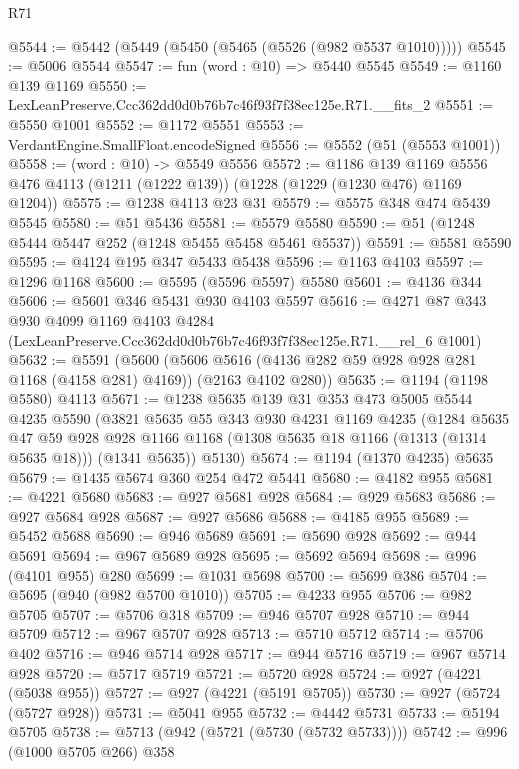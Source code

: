 \begin{lexlean}{R71}
\begin{coremodule}
@5544 := @5442 (@5449 (@5450 (@5465 (@5526 (@982 @5537 @1010)))))
@5545 := @5006 @5544
@5547 := fun (word : @10) => @5440 @5545
@5549 := @1160 @139 @1169
@5550 := LexLeanPreserve.Ccc362dd0d0b76b7c46f93f7f38ec125e.R71.__fits_2
@5551 := @5550 @1001
@5552 := @1172 @5551
@5553 := VerdantEngine.SmallFloat.encodeSigned
@5556 := @5552 (@51 (@5553 @1001))
@5558 := (word : @10) -> @5549 @5556
@5572 := @1186
    @139
    @1169
    @5556
    @476
    @4113
    (@1211 (@1222 @139))
    (@1228 (@1229 (@1230 @476) @1169 @1204))
@5575 := @1238 @4113 @23 @31
@5579 := @5575 @348 @474 @5439 @5545
@5580 := @51 @5436
@5581 := @5579 @5580
@5590 := @51 (@1248 @5444 @5447 @252 (@1248 @5455 @5458 @5461 @5537))
@5591 := @5581 @5590
@5595 := @4124 @195 @347 @5433 @5438
@5596 := @1163 @4103
@5597 := @1296 @1168
@5600 := @5595 (@5596 @5597) @5580
@5601 := @4136 @344
@5606 := @5601 @346 @5431 @930 @4103 @5597
@5616 := @4271
    @87
    @343
    @930
    @4099
    @1169
    @4103
    @4284
    (LexLeanPreserve.Ccc362dd0d0b76b7c46f93f7f38ec125e.R71.__rel_6 @1001)
@5632 := @5591
    (@5600
      (@5606 @5616 (@4136 @282 @59 @928 @928 @281 @1168 (@4158 @281) @4169))
      (@2163 @4102 @280))
@5635 := @1194 (@1198 @5580) @4113
@5671 := @1238
    @5635
    @139
    @31
    @353
    @473
    @5005
    @5544
    @4235
    @5590
    (@3821
      @5635
      @55
      @343
      @930
      @4231
      @1169
      @4235
      (@1284
        @5635
        @47
        @59
        @928
        @928
        @1166
        @1168
        (@1308 @5635 @18 @1166 (@1313 (@1314 @5635 @18)))
        (@1341 @5635))
      @5130)
@5674 := @1194 (@1370 @4235) @5635
@5679 := @1435 @5674 @360 @254 @472 @5441
@5680 := @4182 @955
@5681 := @4221 @5680
@5683 := @927 @5681 @928
@5684 := @929 @5683
@5686 := @927 @5684 @928
@5687 := @927 @5686
@5688 := @4185 @955
@5689 := @5452 @5688
@5690 := @946 @5689
@5691 := @5690 @928
@5692 := @944 @5691
@5694 := @967 @5689 @928
@5695 := @5692 @5694
@5698 := @996 (@4101 @955) @280
@5699 := @1031 @5698
@5700 := @5699 @386
@5704 := @5695 (@940 (@982 @5700 @1010))
@5705 := @4233 @955
@5706 := @982 @5705
@5707 := @5706 @318
@5709 := @946 @5707 @928
@5710 := @944 @5709
@5712 := @967 @5707 @928
@5713 := @5710 @5712
@5714 := @5706 @402
@5716 := @946 @5714 @928
@5717 := @944 @5716
@5719 := @967 @5714 @928
@5720 := @5717 @5719
@5721 := @5720 @928
@5724 := @927 (@4221 (@5038 @955))
@5727 := @927 (@4221 (@5191 @5705))
@5730 := @927 (@5724 (@5727 @928))
@5731 := @5041 @955
@5732 := @4442 @5731
@5733 := @5194 @5705
@5738 := @5713 (@942 (@5721 (@5730 (@5732 @5733))))
@5742 := @996 (@1000 @5705 @266) @358

\end{coremodule}
\end{lexlean}
